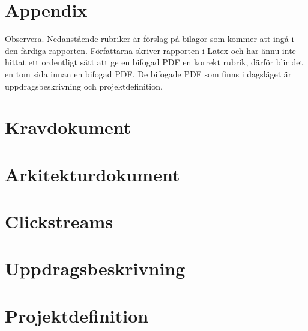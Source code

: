\documentclass[a4paper]{article}
\begin{document}
\newpage





\newpage
\section{Appendix}
\begin{appendices}
Observera.
Nedanstående rubriker är förslag på bilagor som kommer att ingå i den färdiga rapporten. Författarna skriver rapporten i Latex och har ännu inte hittat ett ordentligt sätt att ge en bifogad PDF en korrekt rubrik, därför blir det en tom sida innan en bifogad PDF. De bifogade PDF som finns i dagsläget är uppdragsbeskrivning och projektdefinition.
\section{Kravdokument}
\label{appendix:kravdokument}
\section{Arkitekturdokument}
\label{appendix:arkitekturdokument}
\section{Clickstreams}
\label{appendix:clickstreams}
\section{Uppdragsbeskrivning}
\label{appendix:uppdragsbeskrivning}
%
\section{Projektdefinition}
\label{appendix:projektdef}
%
\end{appendices}
\end{document}
